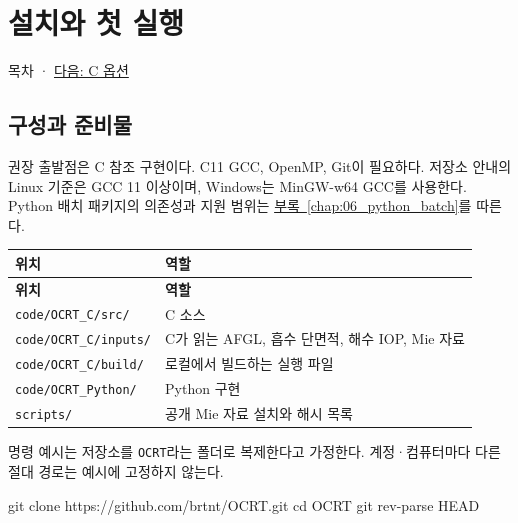 \begingroup
\setlength{\parskip}{3pt}
\chapter{설치와 첫 실행}
\label{chap:02_installation}
목차 · \hyperref[chap:03_options]{다음: C 옵션}

\section{구성과 준비물}
\label{sec:auto:02_installation:1}
권장 출발점은 C 참조 구현이다. C11 GCC, OpenMP, Git이 필요하다. 저장소 안내의 Linux 기준은 GCC 11 이상이며, Windows는 MinGW-w64 GCC를 사용한다. Python 배치 패키지의 의존성과 지원 범위는 \hyperref[chap:06_python_batch]{부록~\ref*{chap:06_python_batch}}를 따른다.


{\TableFont
\begin{longtable}{@{}>{\raggedright\arraybackslash}p{}>{\raggedright\arraybackslash}p{}@{}}
\toprule
\textbf{위치} & \textbf{역할} \\
\midrule
\endfirsthead
\toprule
\textbf{위치} & \textbf{역할} \\
\midrule
\endhead
\bottomrule
\endfoot
\texttt{code/\allowbreak{}OCRT\_\allowbreak{}C/\allowbreak{}src/\allowbreak{}} & C 소스 \\
\texttt{code/\allowbreak{}OCRT\_\allowbreak{}C/\allowbreak{}inputs/\allowbreak{}} & C가 읽는 AFGL, 흡수 단면적, 해수 IOP, Mie 자료 \\
\texttt{code/\allowbreak{}OCRT\_\allowbreak{}C/\allowbreak{}build/\allowbreak{}} & 로컬에서 빌드하는 실행 파일 \\
\texttt{code/\allowbreak{}OCRT\_\allowbreak{}Python/\allowbreak{}} & Python 구현 \\
\texttt{scripts/\allowbreak{}} & 공개 Mie 자료 설치와 해시 목록 \\
\end{longtable}
}

명령 예시는 저장소를 \texttt{OCRT}라는 폴더로 복제한다고 가정한다. 계정·컴퓨터마다 다른 절대 경로는 예시에 고정하지 않는다.


\par\noindent\begin{minipage}{\linewidth}
\begin{ManualCode}
git clone https://github.com/brtnt/OCRT.git
cd OCRT
git rev-parse HEAD
\end{ManualCode}
\end{minipage}\par


